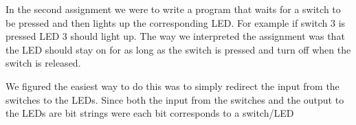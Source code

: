 In the second assignment we were to write a program that waits for a switch
to be pressed and then lights up the corresponding LED. For example if switch 3
is pressed LED 3 should light up. The way we interpreted the assignment was
that the LED should stay on for as long as the switch is pressed and turn off
when the switch is released.

We figured the easiest way to do this was to simply redirect the input from the
switches to the LEDs. Since both the input from the switches and the output to
the LEDs are bit strings were each bit corresponds to a switch/LED 
